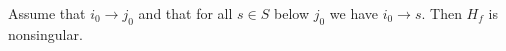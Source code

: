 \begin{theo}
Assume that $i_0 \to j_0$ and that for all $s \in S$ below $j_0$ we have $i_0 \to s$. Then $H_f$ is nonsingular.
\end{theo}
